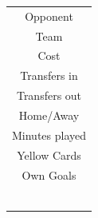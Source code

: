 \begin{table}[H]
\begin{minipage}{.5\textwidth}
\begin{tabular}{c}
    Opponent                              \\
    Team                                  \\
    Cost                                  \\
    Transfers in                          \\
    Transfers out                         \\
    Home/Away                             \\
    Minutes played                        \\
    Yellow Cards                          \\
    Own Goals                             \\
    \\
    \\
    \\
    \\
   \\
   \\
    
    
    \end{tabular}
\label{tab:sig_var_DEF_1}
\end{minipage}
\end{table}

